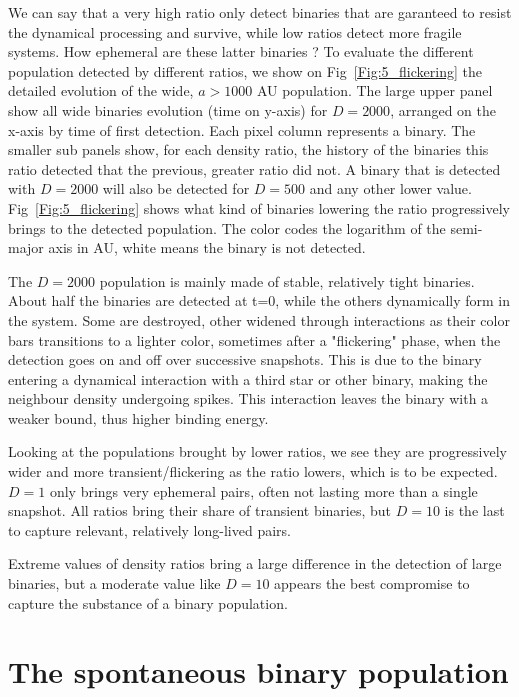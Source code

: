  We can say that a very high ratio only detect binaries that are garanteed to resist the dynamical processing and survive, while low ratios detect more fragile systems. How ephemeral are these latter binaries ? To evaluate the different population detected by different ratios, we show on Fig~\ref{Fig:5_flickering} the detailed evolution of the wide, $a>1000$ AU population. The large upper panel show all wide binaries evolution (time on y-axis) for $D=2000$, arranged on the x-axis by time of first detection. Each pixel column represents a binary. The smaller sub panels show, for each density ratio, the history of the binaries this ratio detected that the previous, greater ratio did not. A binary that is detected with $D=2000$ will also be detected for $D=500$ and any other lower value. Fig~\ref{Fig:5_flickering} shows what kind of binaries lowering the ratio progressively brings to the detected population. The color codes the logarithm of the semi-major axis in AU, white means the binary is not detected.

The $D=2000$ population is mainly made of stable, relatively tight binaries. About half the binaries are detected at t=0, while the others dynamically form in the system. Some are destroyed, other widened through interactions as their color bars transitions to a lighter color, sometimes after a "flickering" phase, when the detection goes on and off over successive snapshots. This is due to the binary entering a dynamical interaction with a third star or other binary, making the neighbour density undergoing spikes. This interaction leaves the binary with a weaker bound, thus higher binding energy. 

Looking at the populations brought by lower ratios, we see they are progressively wider and more transient/flickering as the ratio lowers, which is to be expected. $D=1$ only brings very ephemeral pairs, often not lasting more than a single snapshot. All ratios bring their share of transient binaries, but $D=10$ is the last to capture relevant, relatively long-lived pairs.

Extreme values of density ratios bring a large difference in the detection of large binaries, but a moderate value like $D=10$ appears the best compromise to capture the substance of a binary population.










\section{The spontaneous binary population} 




